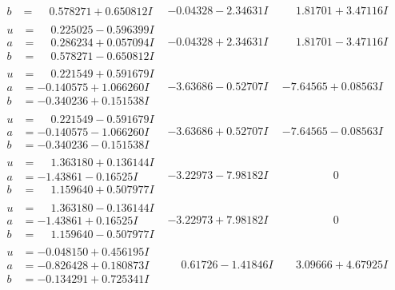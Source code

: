 \documentclass[1p]{elsarticle_modified}
\theoremstyle{definition}
\begin{document}
$$\begin{array}{c|c|c}
\begin{aligned}
b &= \phantom{-}0.578271 + 0.650812 I\end{aligned}
 & -0.04328 - 2.34631 I & \phantom{-}1.81701 + 3.47116 I \\ \hline\begin{aligned}
u &= \phantom{-}0.225025 - 0.596399 I \\
a &= \phantom{-}0.286234 + 0.057094 I \\
b &= \phantom{-}0.578271 - 0.650812 I\end{aligned}
 & -0.04328 + 2.34631 I & \phantom{-}1.81701 - 3.47116 I \\ \hline\begin{aligned}
u &= \phantom{-}0.221549 + 0.591679 I \\
a &= -0.140575 + 1.066260 I \\
b &= -0.340236 + 0.151538 I\end{aligned}
 & -3.63686 - 0.52707 I & -7.64565 + 0.08563 I \\ \hline\begin{aligned}
u &= \phantom{-}0.221549 - 0.591679 I \\
a &= -0.140575 - 1.066260 I \\
b &= -0.340236 - 0.151538 I\end{aligned}
 & -3.63686 + 0.52707 I & -7.64565 - 0.08563 I \\ \hline\begin{aligned}
u &= \phantom{-}1.363180 + 0.136144 I \\
a &= -1.43861 - 0.16525 I \\
b &= \phantom{-}1.159640 + 0.507977 I\end{aligned}
 & -3.22973 - 7.98182 I & \phantom{-0.000000 } 0 \\ \hline\begin{aligned}
u &= \phantom{-}1.363180 - 0.136144 I \\
a &= -1.43861 + 0.16525 I \\
b &= \phantom{-}1.159640 - 0.507977 I\end{aligned}
 & -3.22973 + 7.98182 I & \phantom{-0.000000 } 0 \\ \hline\begin{aligned}
u &= -0.048150 + 0.456195 I \\
a &= -0.826428 + 0.180873 I \\
b &= -0.134291 + 0.725341 I\end{aligned}
 & \phantom{-}0.61726 - 1.41846 I & \phantom{-}3.09666 + 4.67925 I \\ \hline\begin{aligned}

\end{aligned}
\end{array}$$
\end{document}
